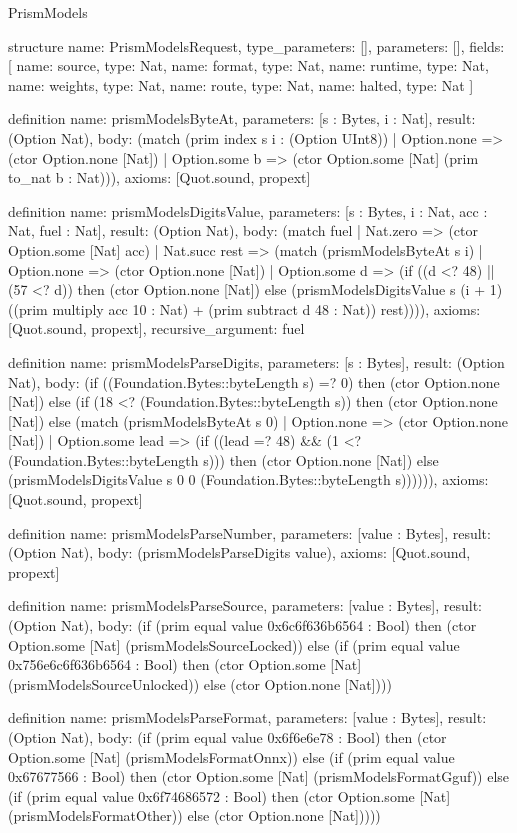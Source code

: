 \begin{lexlean}{PrismModels}
\begin{semanticmodule}
structure{
  name: PrismModelsRequest,
  type_parameters: [],
  parameters: [],
  fields: [
    {name: source, type: Nat},
    {name: format, type: Nat},
    {name: runtime, type: Nat},
    {name: weights, type: Nat},
    {name: route, type: Nat},
    {name: halted, type: Nat}
  ]
}

definition{
  name: prismModelsByteAt,
  parameters: [s : Bytes, i : Nat],
  result: (Option Nat),
  body: (match (prim index s i : (Option UInt8))
    | Option.none => (ctor Option.none [Nat])
    | Option.some b => (ctor Option.some [Nat] (prim to_nat b : Nat))),
  axioms: [Quot.sound, propext]
}

definition{
  name: prismModelsDigitsValue,
  parameters: [s : Bytes, i : Nat, acc : Nat, fuel : Nat],
  result: (Option Nat),
  body: (match fuel
    | Nat.zero => (ctor Option.some [Nat] acc)
    | Nat.succ rest => (match (prismModelsByteAt s i)
      | Option.none => (ctor Option.none [Nat])
      | Option.some d => (if ((d <? 48) || (57 <? d)) then (ctor Option.none [Nat]) else (prismModelsDigitsValue s (i + 1) ((prim multiply acc 10 : Nat) + (prim subtract d 48 : Nat)) rest)))),
  axioms: [Quot.sound, propext],
  recursive_argument: fuel
}

definition{
  name: prismModelsParseDigits,
  parameters: [s : Bytes],
  result: (Option Nat),
  body: (if ((Foundation.Bytes::byteLength s) =? 0) then (ctor Option.none [Nat]) else (if (18 <? (Foundation.Bytes::byteLength s)) then (ctor Option.none [Nat]) else (match (prismModelsByteAt s 0)
    | Option.none => (ctor Option.none [Nat])
    | Option.some lead => (if ((lead =? 48) && (1 <? (Foundation.Bytes::byteLength s))) then (ctor Option.none [Nat]) else (prismModelsDigitsValue s 0 0 (Foundation.Bytes::byteLength s)))))),
  axioms: [Quot.sound, propext]
}

definition{
  name: prismModelsParseNumber,
  parameters: [value : Bytes],
  result: (Option Nat),
  body: (prismModelsParseDigits value),
  axioms: [Quot.sound, propext]
}

definition{
  name: prismModelsParseSource,
  parameters: [value : Bytes],
  result: (Option Nat),
  body: (if (prim equal value 0x6c6f636b6564 : Bool) then (ctor Option.some [Nat] (prismModelsSourceLocked)) else (if (prim equal value 0x756e6c6f636b6564 : Bool) then (ctor Option.some [Nat] (prismModelsSourceUnlocked)) else (ctor Option.none [Nat])))
}

definition{
  name: prismModelsParseFormat,
  parameters: [value : Bytes],
  result: (Option Nat),
  body: (if (prim equal value 0x6f6e6e78 : Bool) then (ctor Option.some [Nat] (prismModelsFormatOnnx)) else (if (prim equal value 0x67677566 : Bool) then (ctor Option.some [Nat] (prismModelsFormatGguf)) else (if (prim equal value 0x6f74686572 : Bool) then (ctor Option.some [Nat] (prismModelsFormatOther)) else (ctor Option.none [Nat]))))
}


\end{semanticmodule}
\end{lexlean}
